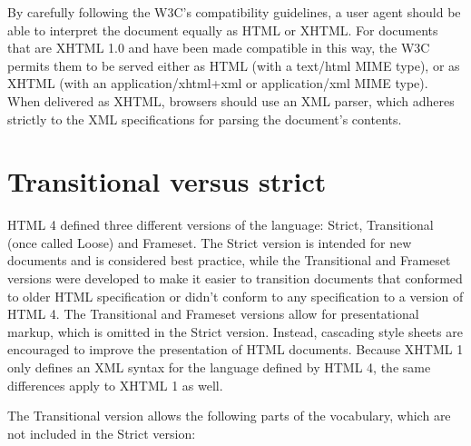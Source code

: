 By carefully following the W3C's compatibility guidelines, a user agent should be able to interpret the document equally as HTML or XHTML. For documents that are XHTML 1.0 and have been made compatible in this way, the W3C permits them to be served either as HTML (with a text/html MIME type), or as XHTML (with an application/xhtml+xml or application/xml MIME type). When delivered as XHTML, browsers should use an XML parser, which adheres strictly to the XML specifications for parsing the document's contents.



\section{Transitional versus strict}

HTML 4 defined three different versions of the language: Strict, Transitional (once called Loose) and Frameset. The Strict version is intended for new documents and is considered best practice, while the Transitional and Frameset versions were developed to make it easier to transition documents that conformed to older HTML specification or didn't conform to any specification to a version of HTML 4. The Transitional and Frameset versions allow for presentational markup, which is omitted in the Strict version. Instead, cascading style sheets are encouraged to improve the presentation of HTML documents. Because XHTML 1 only defines an XML syntax for the language defined by HTML 4, the same differences apply to XHTML 1 as well.

The Transitional version allows the following parts of the vocabulary, which are not included in the Strict version:

